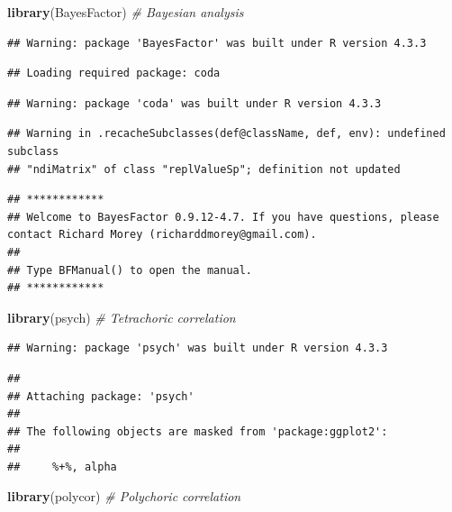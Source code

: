 \documentclass[
]{article}
\newenvironment{Shaded}{\begin{snugshade}}{\end{snugshade}}
\newcommand{\CommentTok}[1]{\textcolor[rgb]{0.56,0.35,0.01}{\textit{#1}}}
\newcommand{\FunctionTok}[1]{\textcolor[rgb]{0.13,0.29,0.53}{\textbf{#1}}}
\newcommand{\NormalTok}[1]{#1}
\begin{document}
\begin{Shaded}
\begin{Highlighting}[]
\FunctionTok{library}\NormalTok{(BayesFactor)  }\CommentTok{\# Bayesian analysis}
\end{Highlighting}
\end{Shaded}

\begin{verbatim}
## Warning: package 'BayesFactor' was built under R version 4.3.3
\end{verbatim}

\begin{verbatim}
## Loading required package: coda
\end{verbatim}

\begin{verbatim}
## Warning: package 'coda' was built under R version 4.3.3
\end{verbatim}

\begin{verbatim}
## Warning in .recacheSubclasses(def@className, def, env): undefined subclass
## "ndiMatrix" of class "replValueSp"; definition not updated
\end{verbatim}

\begin{verbatim}
## ************
## Welcome to BayesFactor 0.9.12-4.7. If you have questions, please contact Richard Morey (richarddmorey@gmail.com).
## 
## Type BFManual() to open the manual.
## ************
\end{verbatim}

\begin{Shaded}
\begin{Highlighting}[]
\FunctionTok{library}\NormalTok{(psych)        }\CommentTok{\# Tetrachoric correlation}
\end{Highlighting}
\end{Shaded}

\begin{verbatim}
## Warning: package 'psych' was built under R version 4.3.3
\end{verbatim}

\begin{verbatim}
## 
## Attaching package: 'psych'
## 
## The following objects are masked from 'package:ggplot2':
## 
##     %+%, alpha
\end{verbatim}

\begin{Shaded}
\begin{Highlighting}[]
\FunctionTok{library}\NormalTok{(polycor)      }\CommentTok{\# Polychoric correlation}
\end{Highlighting}
\end{Shaded}
\end{document}
